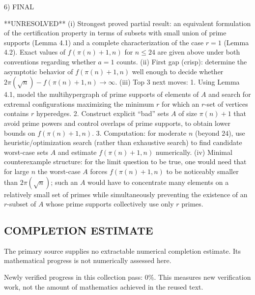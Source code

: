 6) FINAL

**UNRESOLVED**
(i) Strongest proved partial result: an equivalent formulation of the certification property in terms of subsets with small union of prime supports (Lemma 4.1) and a complete characterization of the case $r=1$ (Lemma 4.2). Exact values of $f(\pi(n)+1,n)$ for $n\le 24$ are given above under both conventions regarding whether $a=1$ counts.
(ii) First gap (crisp): determine the asymptotic behavior of $f(\pi(n)+1,n)$ well enough to decide whether $2\pi(\sqrt n)-f(\pi(n)+1,n)\to\infty$.
(iii) Top 3 next moves:
  1. Using Lemma 4.1, model the multihypergraph of prime supports of elements of $A$ and search for extremal configurations maximizing the minimum $r$ for which an $r$-set of vertices contains $r$ hyperedges.
  2. Construct explicit ``bad'' sets $A$ of size $\pi(n)+1$ that avoid prime powers and control overlaps of prime supports, to obtain lower bounds on $f(\pi(n)+1,n)$.
  3. Computation: for moderate $n$ (beyond $24$), use heuristic/optimization search (rather than exhaustive search) to find candidate worst-case sets $A$ and estimate $f(\pi(n)+1,n)$ numerically.
(iv) Minimal counterexample structure: for the limit question to be true, one would need that for large $n$ the worst-case $A$ forces $f(\pi(n)+1,n)$ to be noticeably smaller than $2\pi(\sqrt n)$; such an $A$ would have to concentrate many elements on a relatively small set of primes while simultaneously preventing the existence of an $r$-subset of $A$ whose prime supports collectively use only $r$ primes.


\subsection*{COMPLETION ESTIMATE}
The primary source supplies no extractable numerical completion estimate. Its mathematical progress is not numerically assessed here.

Newly verified progress in this collection pass: $0\%$. This measures new verification work, not the amount of mathematics achieved in the reused text.
